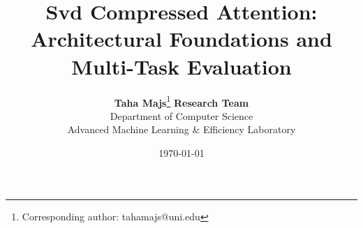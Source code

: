\title{\textbf{Svd Compressed Attention: Architectural Foundations and Multi-Task Evaluation}}

\author{
  \textbf{Taha Majs}\thanks{Corresponding author: tahamajs@uni.edu} \quad \textbf{Research Team} \\
  Department of Computer Science \\
  Advanced Machine Learning \& Efficiency Laboratory
}

\date{\today}
